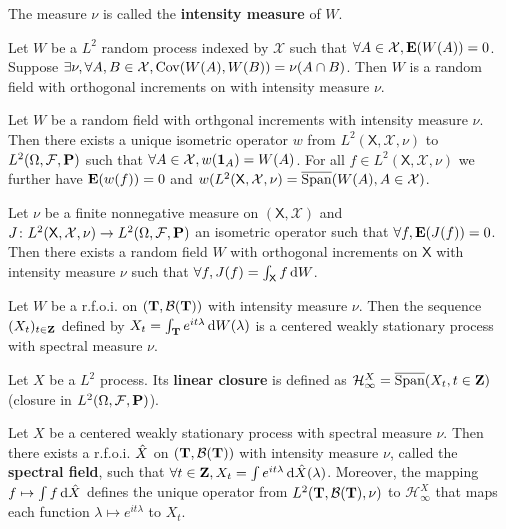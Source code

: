 	The measure $\nu$ is called the \textbf{intensity measure} of $W$.
	
	\begin{lem}
		Let $W$ be a $L^2$ random process indexed by $\mathcal{X}$ such that $\forall A \in \mathcal{X}, \mathbf{E}(W(A)) = 0$.
		Suppose $\exists \nu, \forall A,B \in \mathcal{X}, \operatorname{Cov}(W(A),W(B)) = \nu(A \cap B)$.
		Then $W$ is a random field with orthogonal increments on with intensity measure $\nu$.
	\end{lem}

	\begin{thm}
		Let $W$ be a random field with orthgonal increments with intensity measure $\nu$.
		Then there exists a unique isometric operator $w$ from $L^2(\mathsf{X},\mathcal{X},\nu)$ to $L^2(\Omega,\mathcal{F},\mathbf{P})$ such that $\forall A \in \mathcal{X}, w(\operatorname{\mathbf{1}}_A) = W(A)$.
		For all $f \in L^2(\mathsf{X},\mathcal{X},\nu)$ we further have $\mathbf{E}(w(f)) = 0$ and $w(L^2(\mathsf{X},\mathcal{X},\nu) = \overline{\operatorname{Span}}(W(A), A \in \mathcal{X})$.
	\end{thm}

	\begin{thm}
		Let $\nu$ be a finite nonnegative measure on $(\mathsf{X},\mathcal{X})$ and $J \colon L^2(\mathsf{X},\mathcal{X},\nu) \to L^2(\Omega,\mathcal{F},\mathbf{P})$ an isometric operator such that $\forall f, \mathbf{E}(J(f)) = 0$.
		Then there exists a random field $W$ with orthogonal increments on $\mathsf{X}$ with intensity measure $\nu$ such that $\forall f, J(f) = \int_{\mathsf{X}} f \mathop{}\mathopen{}\mathrm{d} W$.
	\end{thm}

	\begin{pop}
		Let $W$ be a r.f.o.i. on $(\mathbf{T},\mathcal{B}(\mathbf{T}))$ with intensity measure $\nu$.
		Then the sequence $(X_t)_{t \in \mathbf{Z}}$ defined by $X_t = \int_{\mathbf{T}} e^{it \lambda} \mathop{}\mathopen{}\mathrm{d} W(\lambda)$ is a centered weakly stationary process with spectral measure $\nu$.
	\end{pop}

	\begin{defn}
		Let $X$ be a $L^2$ process.
		Its \textbf{linear closure} is defined as $\mathcal{H}_{\infty}^X = \overline{\operatorname{Span}}(X_t, t \in \mathbf{Z})$ (closure in $L^2(\Omega,\mathcal{F},\mathbf{P})$).
	\end{defn}

	\begin{thm}
		Let $X$ be a centered weakly stationary process with spectral measure $\nu$.
		Then there exists a r.f.o.i. $\Hat{X}$ on $(\mathbf{T},\mathcal{B}(\mathbf{T}))$ with intensity measure $\nu$, called the \textbf{spectral field}, such that $\forall t \in \mathbf{Z}, X_t = \int e^{it \lambda} \mathop{}\mathopen{}\mathrm{d} \Hat{X}(\lambda)$.
		Moreover, the mapping $f \mapsto \int f \mathop{}\mathopen{}\mathrm{d} \Hat{X}$ defines the unique operator from $L^2(\mathbf{T},\mathcal{B}(\mathbf{T}),\nu)$ to $\mathcal{H}_{\infty}^X$ that maps each function $\lambda \mapsto e^{it \lambda}$ to $X_t$.
	\end{thm}
